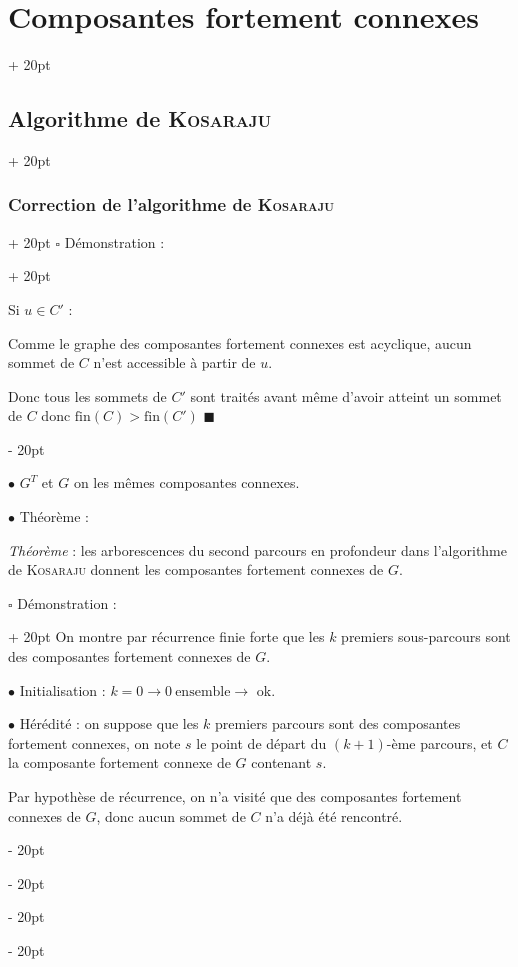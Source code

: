 \documentclass[a4paper, 12pt, twoside]{article}
\newcommand{\ind}[1][20pt]{\advance\leftskip + #1}
\newcommand{\deind}[1][20pt]{\advance\leftskip - #1}
\newenvironment{indt}[2][20pt]{#2 \par \ind[#1]}{\par \deind} %
\begin{document}
\begin{indt}{\section{Composantes fortement connexes}}
\begin{indt}{\subsection{Algorithme de \textsc{Kosaraju}}}
\begin{indt}{\subsubsection{Correction de l'algorithme de \textsc{Kosaraju}}}
\begin{indt}{$\square$ Démonstration :}
                    \vspace{6pt}
                    
                    Si $u \in C'$ :

                    Comme  le graphe des composantes fortement connexes est acyclique, aucun sommet de $C$ n'est accessible à partir de $u$.

                    Donc tous les sommets de $C'$ sont traités avant même d'avoir atteint un sommet de $C$ donc $\mathrm{fin}(C) > \mathrm{fin}(C')$ $\blacksquare$
                \end{indt}

                \vspace{12pt}
                
                $\bullet$  $G^T$ et $G$ on les mêmes composantes connexes.

                \vspace{12pt}
                
                $\bullet$ Théorème :

                \begin{pseudocode}
                    \textit{Théorème} : les arborescences du second parcours en profondeur dans l'algorithme de \textsc{Kosaraju} donnent les composantes fortement connexes de $G$.
                \end{pseudocode}

                \begin{indt}{$\square$ Démonstration :}
                    On montre par récurrence finie forte que les $k$ premiers sous-parcours sont des composantes fortement connexes de $G$.

                    \vspace{6pt}
                    
                    $\bullet$ Initialisation : $k = 0 \rightarrow 0\ \text{ensemble} \rightarrow$ ok.

                    \vspace{6pt}
                    
                    $\bullet$ Hérédité : on suppose que les $k$ premiers parcours sont des composantes fortement connexes, on note $s$ le point de départ du $(k + 1)$-ème parcours, et $C$ la composante fortement connexe de $G$ contenant $s$.

                    Par hypothèse de récurrence, on n'a visité que des composantes fortement connexes de $G$, donc aucun sommet de $C$ n'a déjà été rencontré.


\end{indt}
\end{indt}
\end{indt}
\end{indt}
\end{document}
